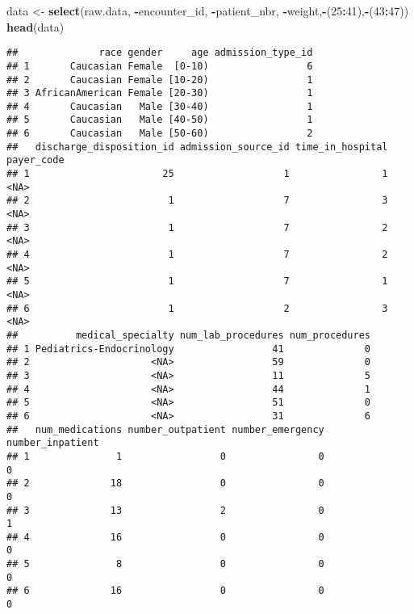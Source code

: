 \documentclass[]{article}
\newenvironment{Shaded}{\begin{snugshade}}{\end{snugshade}}
\newcommand{\KeywordTok}[1]{\textcolor[rgb]{0.13,0.29,0.53}{\textbf{#1}}}
\newcommand{\DecValTok}[1]{\textcolor[rgb]{0.00,0.00,0.81}{#1}}
\newcommand{\StringTok}[1]{\textcolor[rgb]{0.31,0.60,0.02}{#1}}
\newcommand{\OperatorTok}[1]{\textcolor[rgb]{0.81,0.36,0.00}{\textbf{#1}}}
\newcommand{\NormalTok}[1]{#1}
\begin{document}
\begin{Shaded}
\begin{Highlighting}[]
\NormalTok{data <-}\StringTok{ }\KeywordTok{select}\NormalTok{(raw.data,  }\OperatorTok{-}\NormalTok{encounter_id, }\OperatorTok{-}\NormalTok{patient_nbr, }\OperatorTok{-}\NormalTok{weight,}\OperatorTok{-}\NormalTok{(}\DecValTok{25}\OperatorTok{:}\DecValTok{41}\NormalTok{),}\OperatorTok{-}\NormalTok{(}\DecValTok{43}\OperatorTok{:}\DecValTok{47}\NormalTok{))}
\KeywordTok{head}\NormalTok{(data)}
\end{Highlighting}
\end{Shaded}

\begin{verbatim}
##              race gender     age admission_type_id
## 1       Caucasian Female  [0-10)                 6
## 2       Caucasian Female [10-20)                 1
## 3 AfricanAmerican Female [20-30)                 1
## 4       Caucasian   Male [30-40)                 1
## 5       Caucasian   Male [40-50)                 1
## 6       Caucasian   Male [50-60)                 2
##   discharge_disposition_id admission_source_id time_in_hospital payer_code
## 1                       25                   1                1       <NA>
## 2                        1                   7                3       <NA>
## 3                        1                   7                2       <NA>
## 4                        1                   7                2       <NA>
## 5                        1                   7                1       <NA>
## 6                        1                   2                3       <NA>
##          medical_specialty num_lab_procedures num_procedures
## 1 Pediatrics-Endocrinology                 41              0
## 2                     <NA>                 59              0
## 3                     <NA>                 11              5
## 4                     <NA>                 44              1
## 5                     <NA>                 51              0
## 6                     <NA>                 31              6
##   num_medications number_outpatient number_emergency number_inpatient
## 1               1                 0                0                0
## 2              18                 0                0                0
## 3              13                 2                0                1
## 4              16                 0                0                0
## 5               8                 0                0                0
## 6              16                 0                0                0

\end{verbatim}
\end{document}

